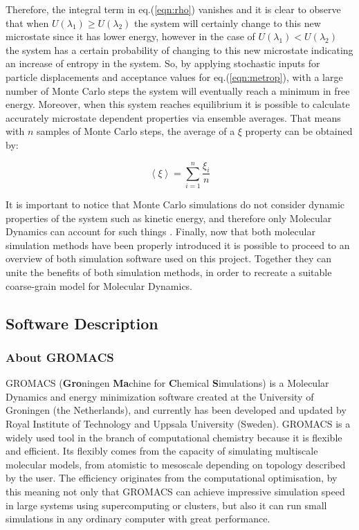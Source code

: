 \documentclass[10pt,a4paper,twoside]{article}
\begin{document}
 Therefore, the integral term in eq.(\ref{eqn:rho}) vanishes and it is clear to observe that when $U(\lambda_1) \geqslant U(\lambda_2)$ the system will certainly change to this new microstate since it has lower energy, however in the case of $U(\lambda_1) < U(\lambda_2)$ the system has a certain probability of changing to this new microstate indicating an increase of entropy in the system. So, by applying stochastic inputs for particle displacements and acceptance values for eq.(\ref{eqn:metrop}), with a large number of Monte Carlo steps the system will eventually reach a minimum in free energy.
  Moreover, when this system reaches equilibrium it is possible to calculate accurately microstate dependent properties via ensemble averages. That means with $n$ samples of Monte Carlo steps, the average of a $ \xi $ property can be obtained by:
 
 \begin{equation}
\left\langle \xi\right\rangle  = \displaystyle \sum_{i=1}^{n} \dfrac{\xi_i}{n}
\label{eqn:average}
\end{equation}

It is important to notice that Monte Carlo simulations do not consider dynamic properties of the system such as kinetic energy, and therefore only Molecular Dynamics can account for such things \cite{satoh}. Finally, now that both molecular simulation methods have been properly introduced it is possible to proceed to an overview of both simulation software used on this project. Together they can unite the benefits of both simulation methods, in order to recreate a suitable coarse-grain model for Molecular Dynamics.
\subsection{Software Description}
\subsubsection{About GROMACS}

 GROMACS (\textbf{Gro}ningen \textbf{Ma}chine for \textbf{C}hemical \textbf{S}imulations) \cite{gromanual} is a Molecular Dynamics and energy minimization software created at the University of Groningen (the Netherlands), and currently has been developed and updated by Royal Institute of Technology and Uppsala University (Sweden). GROMACS is a widely used tool in the branch of computational chemistry because it is flexible and efficient. Its flexibly comes from the capacity of simulating multiscale molecular models, from atomistic to mesoscale depending on topology described by the user. The efficiency originates from the computational optimisation, by this meaning not only that GROMACS can achieve impressive simulation speed in large systems using supercomputing or clusters, but also it can run small simulations in any ordinary computer with great performance.
 
\end{document}
